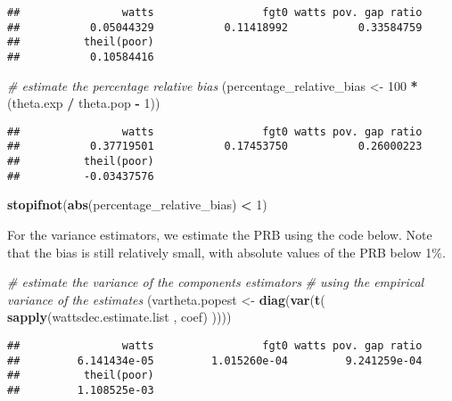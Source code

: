 \documentclass[
]{book}
\newenvironment{Shaded}{\begin{snugshade}}{\end{snugshade}}
\newcommand{\CommentTok}[1]{\textcolor[rgb]{0.56,0.35,0.01}{\textit{#1}}}
\newcommand{\DecValTok}[1]{\textcolor[rgb]{0.00,0.00,0.81}{#1}}
\newcommand{\FunctionTok}[1]{\textcolor[rgb]{0.13,0.29,0.53}{\textbf{#1}}}
\newcommand{\NormalTok}[1]{#1}
\newcommand{\OtherTok}[1]{\textcolor[rgb]{0.56,0.35,0.01}{#1}}
\newcommand{\SpecialCharTok}[1]{\textcolor[rgb]{0.81,0.36,0.00}{\textbf{#1}}}
\begin{document}
\begin{verbatim}
##                watts                 fgt0 watts pov. gap ratio 
##           0.05044329           0.11418992           0.33584759 
##          theil(poor) 
##           0.10584416
\end{verbatim}

\begin{Shaded}
\begin{Highlighting}[]
\CommentTok{\# estimate the percentage relative bias}
\NormalTok{(percentage\_relative\_bias }\OtherTok{\textless{}{-}} \DecValTok{100} \SpecialCharTok{*}\NormalTok{ (theta.exp }\SpecialCharTok{/}\NormalTok{ theta.pop }\SpecialCharTok{{-}} \DecValTok{1}\NormalTok{))}
\end{Highlighting}
\end{Shaded}

\begin{verbatim}
##                watts                 fgt0 watts pov. gap ratio 
##           0.37719501           0.17453750           0.26000223 
##          theil(poor) 
##          -0.03437576
\end{verbatim}

\begin{Shaded}
\begin{Highlighting}[]
\FunctionTok{stopifnot}\NormalTok{(}\FunctionTok{abs}\NormalTok{(percentage\_relative\_bias) }\SpecialCharTok{\textless{}} \DecValTok{1}\NormalTok{)}
\end{Highlighting}
\end{Shaded}

For the variance estimators, we estimate the PRB using the code below.
Note that the bias is still relatively small, with absolute values of the PRB below 1\%.

\begin{Shaded}
\begin{Highlighting}[]
\CommentTok{\# estimate the variance of the components estimators}
\CommentTok{\# using the empirical variance of the estimates}
\NormalTok{(vartheta.popest }\OtherTok{\textless{}{-}}
   \FunctionTok{diag}\NormalTok{(}\FunctionTok{var}\NormalTok{(}\FunctionTok{t}\NormalTok{(}
     \FunctionTok{sapply}\NormalTok{(wattsdec.estimate.list , coef)}
\NormalTok{   ))))}
\end{Highlighting}
\end{Shaded}

\begin{verbatim}
##                watts                 fgt0 watts pov. gap ratio 
##         6.141434e-05         1.015260e-04         9.241259e-04 
##          theil(poor) 
##         1.108525e-03
\end{verbatim}
\end{document}
